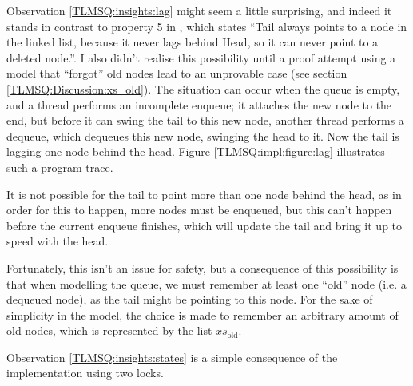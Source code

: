 \documentclass[a4paper, 10pt]{report}
\theoremstyle{definition}
\newcommand{\xsold}{xs_{\mathrm{old}}}
\begin{document}
Observation \ref{TLMSQ:insights:lag} might seem a little surprising, and indeed it stands in contrast to property 5 in \citet{DBLP:conf/podc/MichaelS96}, which states \enquote{Tail always points to a node in the linked list, because it never lags behind Head, so it can never point to a deleted node.}. I also didn't realise this possibility until a proof attempt using a model that ``forgot'' old nodes lead to an unprovable case (see section \ref{TLMSQ:Discussion:xs_old}). The situation can occur when the queue is empty, and a thread performs an incomplete enqueue; it attaches the new node to the end, but before it can swing the tail to this new node, another thread performs a dequeue, which dequeues this new node, swinging the head to it. Now the tail is lagging one node behind the head. Figure \ref{TLMSQ:impl:figure:lag} illustrates such a program trace.

It is not possible for the tail to point more than one node behind the head, as in order for this to happen, more nodes must be enqueued, but this can't happen before the current enqueue finishes, which will update the tail and bring it up to speed with the head.

Fortunately, this isn't an issue for safety, but a consequence of this possibility is that when modelling the queue, we must remember at least one ``old'' node (i.e. a dequeued node), as the tail might be pointing to this node. For the sake of simplicity in the model, the choice is made to remember an arbitrary amount of old nodes, which is represented by the list $\xsold$.

Observation \ref{TLMSQ:insights:states} is a simple consequence of the implementation using two locks.
\end{document}
